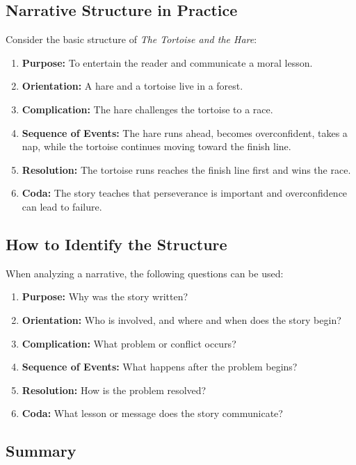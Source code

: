 \subsection{Narrative Structure in Practice}

Consider the basic structure of \textit{The Tortoise and the Hare}:


\begin{enumerate}
\item \textbf{Purpose: }To entertain the reader and communicate a moral lesson.
\item \textbf{Orientation: }A hare and a tortoise live in a forest.
\item \textbf{Complication: }The hare challenges the tortoise to a race.
\item \textbf{Sequence of Events: }The hare runs ahead, becomes overconfident, takes a nap, while the tortoise continues moving toward the finish line.
\item \textbf{Resolution: }The tortoise runs reaches the finish line first and wins the race.
\item \textbf{Coda: }The story teaches that perseverance is important and overconfidence can lead to failure.
\end{enumerate}

\subsection{How to Identify the Structure}

When analyzing a narrative, the following questions can be used:

\begin{enumerate}
\item \textbf{Purpose: }Why was the story written?
\item \textbf{Orientation: }Who is involved, and where and when does the story begin?
\item \textbf{Complication: }What problem or conflict occurs?
\item \textbf{Sequence of Events: }What happens after the problem begins?
\item \textbf{Resolution: }How is the problem resolved?
\item \textbf{Coda: }What lesson or message does the story communicate?
\end{enumerate}

\subsection{Summary}

